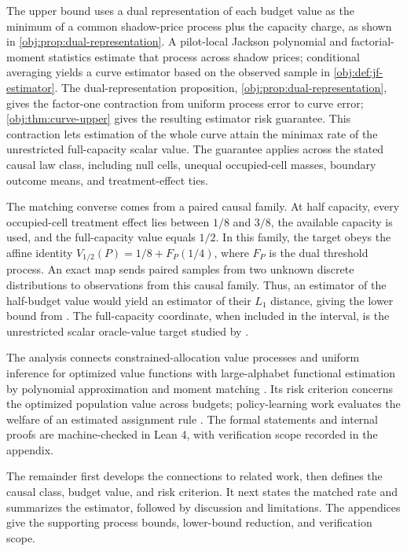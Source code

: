 The upper bound uses a dual representation of each budget value as the minimum of a common shadow-price process plus the capacity charge, as shown in \cref{obj:prop:dual-representation}. A pilot-local Jackson polynomial and factorial-moment statistics estimate that process across shadow prices; conditional averaging yields a curve estimator based on the observed sample in \cref{obj:def:jf-estimator}. The dual-representation proposition, \cref{obj:prop:dual-representation}, gives the factor-one contraction from uniform process error to curve error; \cref{obj:thm:curve-upper} gives the resulting estimator risk guarantee. This contraction lets estimation of the whole curve attain the minimax rate of the unrestricted full-capacity scalar value. The guarantee applies across the stated causal law class, including null cells, unequal occupied-cell masses, boundary outcome means, and treatment-effect ties.

The matching converse comes from a paired causal family. At half capacity, every occupied-cell treatment effect lies between \(1/8\) and \(3/8\), the available capacity is used, and the full-capacity value equals \(1/2\). In this family, the target obeys the affine identity \(V_{1/2}(P)=1/8+F_P(1/4)\), where \(F_P\) is the dual threshold process. An exact map sends paired samples from two unknown discrete distributions to observations from this causal family. Thus, an estimator of the half-budget value would yield an estimator of their \(L_1\) distance, giving the lower bound from \citet[Theorem 3 and the unknown-both-distributions reduction following Theorem 6]{JiaoHanWeissman2018}. The full-capacity coordinate, when included in the interval, is the unrestricted scalar oracle-value target studied by \citet{CausalSmithUnrestricted2026}.

The analysis connects constrained-allocation value processes \citep[Section 4 and Theorem 4.1.1]{FengHongNekipelov2026} and uniform inference for optimized value functions \citep{FirpoGalvaoParker2023} with large-alphabet functional estimation by polynomial approximation and moment matching \citep{JiaoVenkatHanWeissman2015,CaiLow2011}. Its risk criterion concerns the optimized population value across budgets; policy-learning work evaluates the welfare of an estimated assignment rule \citep{KitagawaTetenov2018,AtheyWager2021,Pellatt2023}. The formal statements and internal proofs are machine-checked in Lean 4, with verification scope recorded in the appendix.

The remainder first develops the connections to related work, then defines the causal class, budget value, and risk criterion. It next states the matched rate and summarizes the estimator, followed by discussion and limitations. The appendices give the supporting process bounds, lower-bound reduction, and verification scope.

